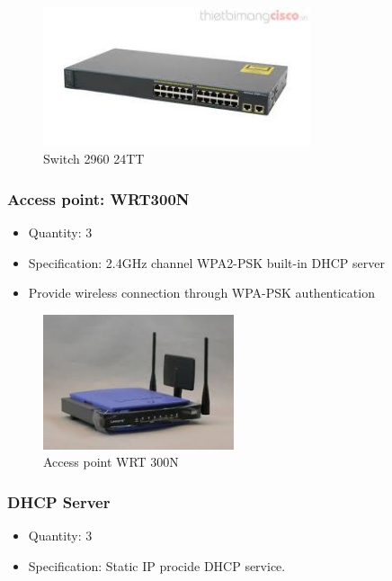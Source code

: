 \begin{figure}[H]
    \centering
    \includegraphics[width=0.7\textwidth]{./assets/switch.png}
    \caption{Switch 2960 24TT}
\end{figure}

\subsubsection{Access point: WRT300N}
\begin{itemize}
    \item Quantity: 3
    \item Specification: 2.4GHz channel WPA2-PSK built-in DHCP server

    \item Provide wireless connection through WPA-PSK authentication
\end{itemize}

\begin{figure}[H]
    \centering
    \includegraphics[width=0.5\textwidth]{./assets/wireless_router.png}
    \caption{Access point WRT 300N}
\end{figure}

\subsubsection{DHCP Server}
\begin{itemize}
    \item Quantity: 3
    \item Specification: Static IP procide DHCP service.
\end{itemize}

